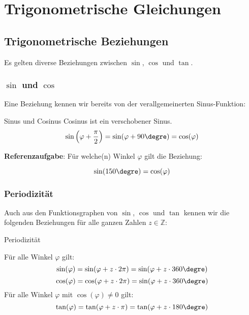 
\section{Trigonometrische Gleichungen}


\subsection{Trigonometrische Beziehungen}
Es gelten diverse Beziehungen zwischen $\sin$, $\cos$ und $\tan$.

\subsubsection{$\sin$ und $\cos$}
Eine Beziehung kennen wir bereits von der verallgemeinerten
Sinus-Funktion:

\begin{bemerkung}{Sinus und Cosinus}{}
  Cosinus ist ein verschobener Sinus.
  $$\sin\left(\varphi+\frac{\pi}{2}\right) = \sin(\varphi+90\degre)= \cos(\varphi)$$
\end{bemerkung}

\textbf{Referenzaufgabe}: Für welche(n) Winkel $\varphi$ gilt die Beziehung:

$$\sin(150\degre) = \cos(\varphi)$$



\subsubsection{Periodizität}
Auch aus den Funktionsgraphen von $\sin$, $\cos$ und $\tan$ kennen wir die
folgenden Beziehungen für alle ganzen Zahlen $z\in\mathbb{Z}$:
\begin{bemerkung}{Periodizität}{}

  Für alle Winkel $\varphi$ gilt:
  $$\sin(\varphi) = \sin(\varphi + z\cdot2\pi) = \sin(\varphi + z\cdot360\degre)$$
  $$\cos(\varphi) = \cos(\varphi + z\cdot2\pi) = \sin(\varphi + z\cdot360\degre)$$
  Für alle Winkel $\varphi$ mit $\cos(\varphi)\ne 0$ gilt:
  $$\tan(\varphi) = \tan(\varphi + z\cdot\pi) =\tan(\varphi + z\cdot{}180\degre)$$
  \end{bemerkung}
\newpage

